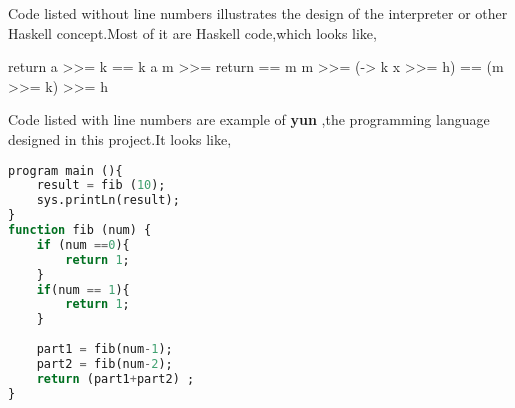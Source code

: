 Code listed without line numbers illustrates the design of the interpreter or other Haskell concept.Most of it are Haskell code,which looks like,
\begin{hcode}
 return a >>= k  ==  k a
 m >>= return  ==  m
 m >>= (\x -> k x >>= h)  ==  (m >>= k) >>= h
\end{hcode}


Code listed with line numbers are example of \textbf{yun} ,the programming language designed in this project.It looks like,

\begin{lstlisting}[language=SQL]
program main (){
	result = fib (10);
	sys.printLn(result);	
} 
function fib (num) {
	if (num ==0){
		return 1;
	}
	if(num == 1){
		return 1;
	}
	
	part1 = fib(num-1);
	part2 = fib(num-2);
	return (part1+part2) ;
}
\end{lstlisting}
